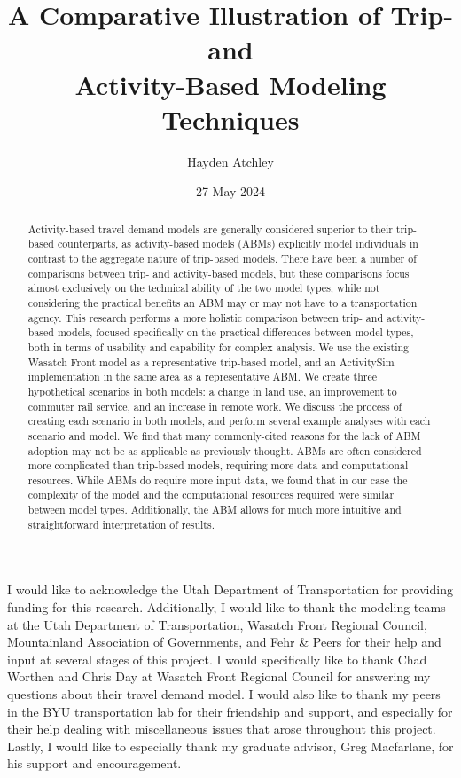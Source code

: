 \documentclass[fancy, oneside, mastersfancy, ms]{byuthesis}
\title{A Comparative Illustration of Trip- and\\
Activity-Based Modeling Techniques}
\author{Hayden Atchley}
\date{27 May 2024}
\begin{document}
\frontmatter
\titlepage
\cleardoublepage

\customtitlepage
\cleardoublepage


  \begin{abstract}
Activity-based travel demand models are generally considered superior to
their trip-based counterparts, as activity-based models (ABMs)
explicitly model individuals in contrast to the aggregate nature of
trip-based models. There have been a number of comparisons between trip-
and activity-based models, but these comparisons focus almost
exclusively on the technical ability of the two model types, while not
considering the practical benefits an ABM may or may not have to a
transportation agency. This research performs a more holistic comparison
between trip- and activity-based models, focused specifically on the
practical differences between model types, both in terms of usability
and capability for complex analysis. We use the existing Wasatch Front
model as a representative trip-based model, and an ActivitySim
implementation in the same area as a representative ABM. We create three
hypothetical scenarios in both models: a change in land use, an
improvement to commuter rail service, and an increase in remote work. We
discuss the process of creating each scenario in both models, and
perform several example analyses with each scenario and model. We find
that many commonly-cited reasons for the lack of ABM adoption may not be
as applicable as previously thought. ABMs are often considered more
complicated than trip-based models, requiring more data and
computational resources. While ABMs do require more input data, we found
that in our case the complexity of the model and the computational
resources required were similar between model types. Additionally, the
ABM allows for much more intuitive and straightforward interpretation of
results.
\end{abstract}
\cleardoublepage

\begin{acknowledgments}
I would like to acknowledge the Utah Department of Transportation for
providing funding for this research. Additionally, I would like to thank
the modeling teams at the Utah Department of Transportation, Wasatch
Front Regional Council, Mountainland Association of Governments, and
Fehr \& Peers for their help and input at several stages of this
project. I would specifically like to thank Chad Worthen and Chris Day
at Wasatch Front Regional Council for answering my questions about their
travel demand model. I would also like to thank my peers in the BYU
transportation lab for their friendship and support, and especially for
their help dealing with miscellaneous issues that arose throughout this
project. Lastly, I would like to especially thank my graduate advisor,
Greg Macfarlane, for his support and encouragement.
\end{acknowledgments}
\cleardoublepage
\end{document}

